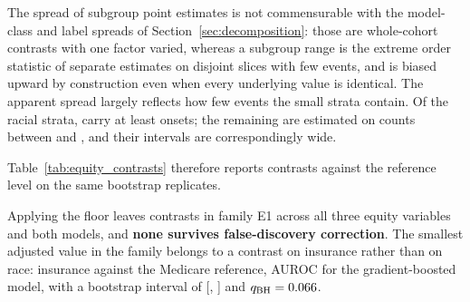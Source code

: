 \begin{table}[H]
    \centering\footnotesize
    \caption{AUROC by racial stratum (Variant B, temporal test) with 95\%
    stay-level cluster-bootstrap intervals, stratified within stratum,
    $B = 2{,}000$, ordered by exposure. $\dagger$ marks strata with fewer than
    \pcMinSubgroupEvents{} sepsis onsets, which are neither interpreted nor
    entered into family E1 (Section~\ref{sec:equity_strata}).
    \textbf{[E] exploratory.}}
    \label{tab:equity_performance}
\end{table}

The spread of subgroup point estimates is not commensurable with the
model-class and label spreads of Section~\ref{sec:decomposition}: those are
whole-cohort contrasts with one factor varied, whereas a subgroup range is the
extreme order statistic of separate estimates on disjoint slices with few
events, and is biased upward by construction even when every underlying value
is identical. The apparent spread largely reflects how few events the small
strata contain. Of the racial strata,
\pcNSubgroupsAboveFloor{} carry at least \pcMinSubgroupEvents{} onsets; the
remaining \pcEquityRaceBelowFloorN{} are estimated on counts between
\pcEquityRaceBelowFloorMin{} and \pcEquityRaceBelowFloorMax, and their
intervals are correspondingly wide.

Table~\ref{tab:equity_contrasts} therefore reports contrasts against the
reference level on the same bootstrap replicates.

\begin{table}[H]
    \centering\footnotesize
    \caption{Exploratory family E1 in full: all \pcEquityNContrastsEOne{}
    subgroup AUROC contrasts clearing the \pcMinSubgroupEvents{}-event floor,
    across race, language and insurance and for both fitted models, ordered by
    adjusted $p$-value. $q_{\text{BH}}$ is the Benjamini--Hochberg adjusted
    value over the whole family. \textbf{No contrast is significant}; two
    unadjusted intervals exclude zero. The reference level is the largest
    stratum of its variable (Section~\ref{sec:equity_strata}).
    \textbf{[E] exploratory.}}
    \label{tab:equity_contrasts}
\end{table}

Applying the floor leaves \pcEquityNContrastsEOne{} contrasts in family E1
across all three equity variables and both models, and \textbf{none survives
false-discovery correction}. The smallest adjusted value in the family belongs
to a contrast on insurance rather than on race: \pcEquityTopEOneLevel{}
insurance against the Medicare reference, \pcEquityTopEOneDelta{} AUROC for the
gradient-boosted model, with a bootstrap interval of
[\pcEquityTopEOneCiLo, \pcEquityTopEOneCiHi] and
$q_{\text{BH}} = 0.066$.

